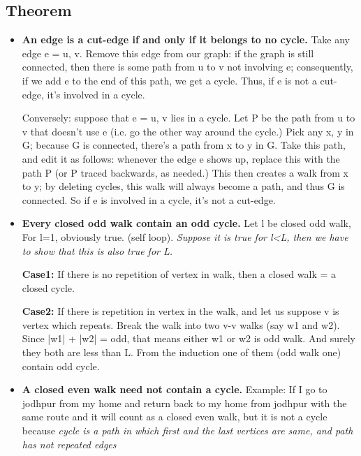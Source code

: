 \subsection{Theorem}
\begin{itemize}
\item \textbf{An edge is a cut-edge if and only if it belongs to no cycle.}
Take any edge e = {u, v}. Remove this edge from our graph: if the graph is still
connected, then there is some path from u to v not involving e; consequently, if we add e
to the end of this path, we get a cycle. Thus, if e is not a cut-edge, it’s involved in a cycle.


Conversely: suppose that e = {u, v} lies in a cycle. Let P be the path from u to v that
doesn’t use e (i.e. go the other way around the cycle.) Pick any x, y in G; because G is
connected, there’s a path from x to y in G. Take this path, and edit it as follows: whenever
the edge e shows up, replace this with the path P (or P traced backwards, as needed.) This
then creates a walk from x to y; by deleting cycles, this walk will always become a path,
and thus G is connected. So if e is involved in a cycle, it’s not a cut-edge.

\item \textbf{Every closed odd walk contain an odd cycle.}
    Let l be closed odd walk, For l=1, obviously true. (self loop).
    \textit{Suppose it is true for l<L, then we have to show that this is also true for L.}


    \textbf{Case1:} If there is no repetition of vertex in walk, then a closed walk = a closed cycle.


    \textbf{Case2:} If there is repetition in vertex in the walk, and let us suppose v is
    vertex which repeats. Break the walk into two v-v walks (say w1 and w2).
    Since |w1| + |w2| = odd, that means either w1 or w2 is odd walk. And surely
    they both are less than L. From the induction one of them (odd walk one)
    contain odd cycle.

\item \textbf{A closed even walk need not contain a cycle.}
    Example: If I go to jodhpur from my home and return back to my home from jodhpur with the same 
    route and it will count as a closed even walk, but it is not a cycle because \textit{ cycle is 
    a path in which first and the last vertices are same, and path has not repeated edges}

\end{itemize}






